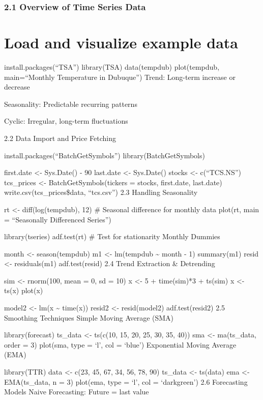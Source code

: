 \documentclass[
  letterpaper,
  DIV=11,
  numbers=noendperiod]{scrreprt}
\begin{document}
{\subsection{2.1 Overview of Time Series
Data}\label{overview-of-time-series-data}


\chapter{Load and visualize example
data}\label{load-and-visualize-example-data}

install.packages(``TSA'') library(TSA) data(tempdub) plot(tempdub,
main=``Monthly Temperature in Dubuque'') Trend: Long-term increase or
decrease

Seasonality: Predictable recurring patterns

Cyclic: Irregular, long-term fluctuations

2.2 Data Import and Price Fetching

install.packages(``BatchGetSymbols'') library(BatchGetSymbols)

first.date \textless- Sys.Date() - 90 last.date \textless- Sys.Date()
stocks \textless- c(``TCS.NS'') tcs\_prices \textless-
BatchGetSymbols(tickers = stocks, first.date, last.date)
write.csv(tcs\_prices\$data, ``tcs.csv'') 2.3 Handling Seasonality

rt \textless- diff(log(tempdub), 12) \# Seasonal difference for monthly
data plot(rt, main = ``Seasonally Differenced Series'')

library(tseries) adf.test(rt) \# Test for stationarity Monthly Dummies

month \textless- season(tempdub) m1 \textless- lm(tempdub
\textasciitilde{} month - 1) summary(m1) resid \textless- residuals(m1)
adf.test(resid) 2.4 Trend Extraction \& Detrending

sim \textless- rnorm(100, mean = 0, sd = 10) x \textless- 5 +
time(sim)*3 + ts(sim) x \textless- ts(x) plot(x)

model2 \textless- lm(x \textasciitilde{} time(x)) resid2 \textless-
resid(model2) adf.test(resid2) 2.5 Smoothing Techniques Simple Moving
Average (SMA)

library(forecast) ts\_data \textless- ts(c(10, 15, 20, 25, 30, 35, 40))
sma \textless- ma(ts\_data, order = 3) plot(sma, type = `l', col =
`blue') Exponential Moving Average (EMA)

library(TTR) data \textless- c(23, 45, 67, 34, 56, 78, 90) ts\_data
\textless- ts(data) ema \textless- EMA(ts\_data, n = 3) plot(ema, type =
`l', col = `darkgreen') 2.6 Forecasting Models Naive Forecasting: Future
= last value

}
\end{document}
